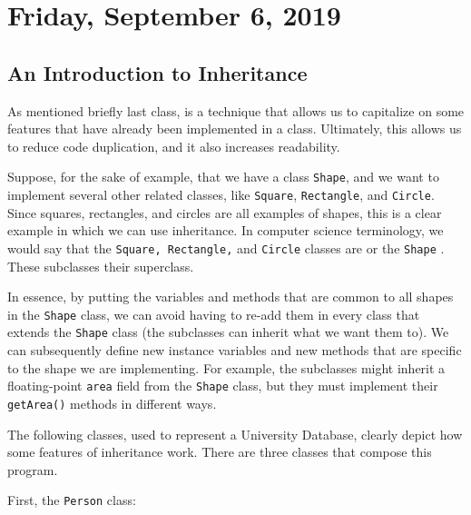 \section{Friday, September 6, 2019}

\subsection{An Introduction to Inheritance}
As mentioned briefly last class,  is a technique that allows us to capitalize on some features that have already been implemented in a class. Ultimately, this allows us to reduce code duplication, and it also increases readability.


Suppose, for the sake of example, that we have a class \verb!Shape!, and we want to implement several other related classes, like \verb!Square!, \verb!Rectangle!, and \verb!Circle!. Since squares, rectangles, and circles are all examples of shapes, this is a clear example in which we can use inheritance. In computer science terminology, we would say that the \verb!Square, Rectangle,! and \verb!Circle! classes are  or the \verb!Shape! . These subclasses  their superclass. 

In essence, by putting the variables and methods that are common to all shapes in the \verb!Shape! class, we can avoid having to re-add them in every class that extends the \verb!Shape! class (the subclasses can inherit what we want them to). We can subsequently define new instance variables and new methods that are specific to the shape we are implementing. For example, the subclasses might inherit a floating-point \verb!area! field from the \verb!Shape! class, but they must implement their \verb!getArea()! methods in different ways.



The following classes, used to represent a University Database, clearly depict how some features of inheritance work. There are three classes that compose this program. 

First, the \verb!Person! class:

